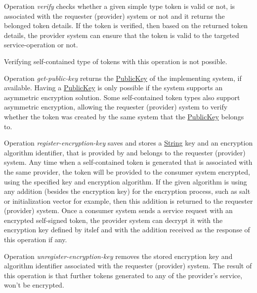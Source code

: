 \documentclass[a4paper]{arrowhead}
\newcommand{\pref}[1]{{\textcolor{ArrowheadGrey}{\hyperref[sec:model:primitives:#1]{#1}}}}
\begin{document}

Operation \textit{verify} checks whether a given simple type token is valid or not, is associated with the requester (provider) system or not and it returns the belonged token details. If the token is verified, then based on the returned token details, the provider system can ensure that the token is valid to the targeted service-operation or not.

Verifying self-contained type of tokens with this operation is not possible.


Operation \textit{get-public-key} returns the \pref{PublicKey} of the implementing system, if available. Having a \pref{PublicKey} is only possible if the system supports an asymmetric encryption solution. Some self-contained token types also support asymmetric encryption, allowing the requester (provider) system to verify whether the token was created by the same system that the \pref{PublicKey} belongs to.


Operation \textit{register-encryption-key} saves and stores a \pref{String} key and an encryption algorithm identifier, that is provided by and belongs to the requester (provider) system. Any time when a self-contained token is generated that is associated with the same provider, the token will be provided to the consumer system encrypted, using the specified key and encryption algorithm. If the given algorithm is using any addition (besides the encryption key) for the encryption process, such as salt or initialization vector for example, then this addition is returned to the requester (provider) system. Once a consumer system sends a service request with an encrypted self-signed token, the provider system can decrypt it with the encryption key defined by itslef and with the addition received as the response of this operation if any.


Operation \textit{unregister-encryption-key} removes the stored encryption key and algorithm identifier associated with the requester (provider) system. The result of this operation is that further tokens generated to any of the provider's service, won't be encrypted. 
\end{document}
